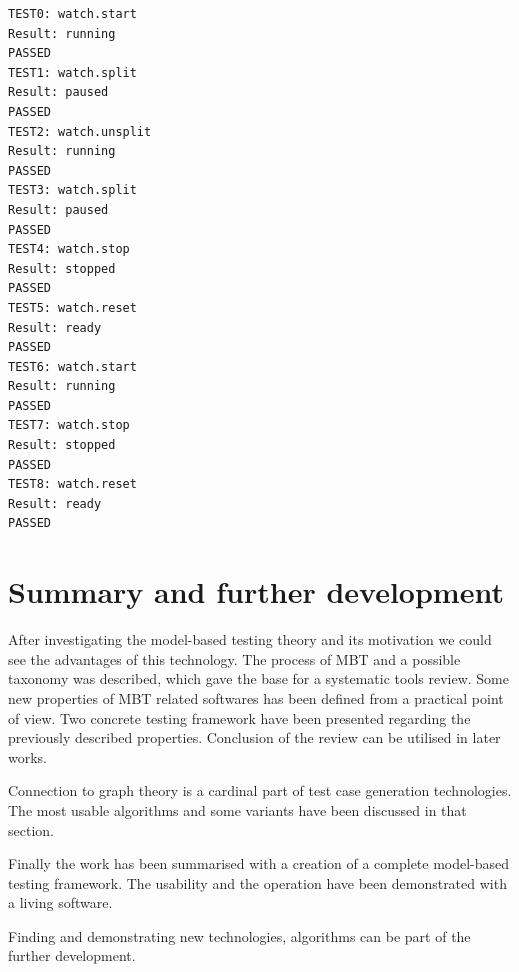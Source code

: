 \documentclass{article}
\begin{document}
\begin{lstlisting}[label={lst:executiontrace}, caption=Test execution trace,breaklines=true,basicstyle=\ttfamily\footnotesize,]
TEST0: watch.start
Result: running
PASSED
TEST1: watch.split
Result: paused
PASSED
TEST2: watch.unsplit
Result: running
PASSED
TEST3: watch.split
Result: paused
PASSED
TEST4: watch.stop
Result: stopped
PASSED
TEST5: watch.reset
Result: ready
PASSED
TEST6: watch.start
Result: running
PASSED
TEST7: watch.stop
Result: stopped
PASSED
TEST8: watch.reset
Result: ready
PASSED
\end{lstlisting}



\section{Summary and further development}
\label{sec:summary}

After investigating the model-based testing theory and its motivation we could see the advantages of this technology. The process of MBT and a possible taxonomy was described, which gave the base for a systematic tools review. Some new properties of MBT related softwares has been defined from a practical point of view. Two concrete testing framework have been presented regarding the previously described properties. Conclusion of the review can be utilised in later works.

Connection to graph theory is a cardinal part of test case generation technologies. The most usable algorithms and some variants have been discussed in that section.

Finally the work has been summarised with a creation of a complete model-based testing framework. The usability and the operation have been demonstrated with a living software.

Finding and demonstrating new technologies, algorithms can be part of the further development.


\clearpage
\nocite{*}


\end{document}

